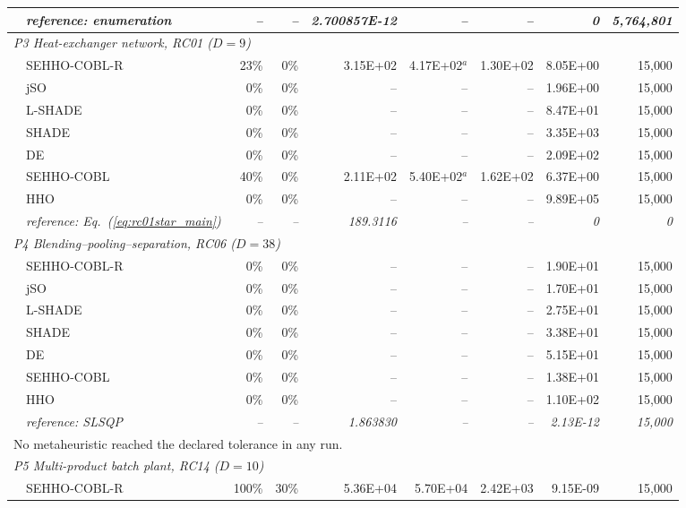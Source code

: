 \begin{table}[htbp]
{\begin{tabular}{llrrrrrrr}
 & \textit{reference: enumeration} & \textit{--} & \textit{--} & \textit{2.700857E-12} & \textit{--} & \textit{--} & \textit{0} & \textit{5{,}764{,}801} \\
\midrule
\multicolumn{9}{l}{\textit{P3 Heat-exchanger network, RC01 ($D{=}9$)}} \\
 & SEHHO-COBL-R & 23\% & 0\% & 3.15E+02 & 4.17E+02$^{a}$ & 1.30E+02 & 8.05E+00 & 15{,}000 \\
 & jSO & 0\% & 0\% & -- & -- & -- & 1.96E+00 & 15{,}000 \\
 & L-SHADE & 0\% & 0\% & -- & -- & -- & 8.47E+01 & 15{,}000 \\
 & SHADE & 0\% & 0\% & -- & -- & -- & 3.35E+03 & 15{,}000 \\
 & DE & 0\% & 0\% & -- & -- & -- & 2.09E+02 & 15{,}000 \\
 & SEHHO-COBL & 40\% & 0\% & 2.11E+02 & 5.40E+02$^{a}$ & 1.62E+02 & 6.37E+00 & 15{,}000 \\
 & HHO & 0\% & 0\% & -- & -- & -- & 9.89E+05 & 15{,}000 \\
 & \textit{reference: Eq.~(\ref{eq:rc01star_main})} & \textit{--} & \textit{--} & \textit{189.3116} & \textit{--} & \textit{--} & \textit{0} & \textit{0} \\
\midrule
\multicolumn{9}{l}{\textit{P4 Blending--pooling--separation, RC06 ($D{=}38$)}} \\
 & SEHHO-COBL-R & 0\% & 0\% & -- & -- & -- & 1.90E+01 & 15{,}000 \\
 & jSO & 0\% & 0\% & -- & -- & -- & 1.70E+01 & 15{,}000 \\
 & L-SHADE & 0\% & 0\% & -- & -- & -- & 2.75E+01 & 15{,}000 \\
 & SHADE & 0\% & 0\% & -- & -- & -- & 3.38E+01 & 15{,}000 \\
 & DE & 0\% & 0\% & -- & -- & -- & 5.15E+01 & 15{,}000 \\
 & SEHHO-COBL & 0\% & 0\% & -- & -- & -- & 1.38E+01 & 15{,}000 \\
 & HHO & 0\% & 0\% & -- & -- & -- & 1.10E+02 & 15{,}000 \\
 & \textit{reference: SLSQP} & \textit{--} & \textit{--} & \textit{1.863830} & \textit{--} & \textit{--} & \textit{2.13E-12} & \textit{15{,}000} \\
\multicolumn{9}{l}{\footnotesize No metaheuristic reached the declared tolerance in any run.} \\
\midrule
\multicolumn{9}{l}{\textit{P5 Multi-product batch plant, RC14 ($D{=}10$)}} \\
 & SEHHO-COBL-R & 100\% & 30\% & 5.36E+04 & 5.70E+04 & 2.42E+03 & 9.15E-09 & 15{,}000 \\

\end{tabular}}
\end{table}
